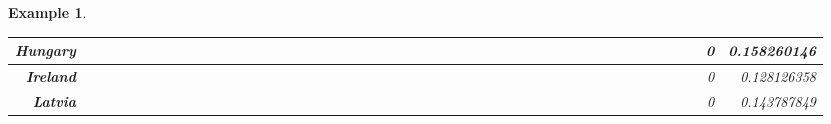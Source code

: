 \documentclass[a4paper,11pt]{report}
\newtheorem{example}[theorem]{Example}
\begin{document}
\begin{example}
\begin{appendices}
\begin{landscape}
\begin{longtable}{r|r|r|r|r|r|r|r|r|r|r|r|r|r|r|r|r|r|r|r|r|r|r|r|r|r|r|r|r|r|r|r|r|r|r|r|r|r|r|r|r|r|r|r|r|r|r|}
\multicolumn{1}{|r|}{\textbf{Hungary}}               &                  &                  &                  &                     &                  &                  &                                &                   &                  &                 &                         &                  &                  &                           &                  &                 &                  &                 &                  &                  &                  &                 &                 &                    &                &                  &                     &                 &                 &                   &                  &                 &                 &                   &                   &                &                 &                      &                          &                 &                  &                         &                 &                & 0                        & 0.158260146        \\ \hline
\multicolumn{1}{|r|}{\textbf{Ireland}}               &                  &                  &                  &                     &                  &                  &                                &                   &                  &                 &                         &                  &                  &                           &                  &                 &                  &                 &                  &                  &                  &                 &                 &                    &                &                  &                     &                 &                 &                   &                  &                 &                 &                   &                   &                &                 &                      &                          &                 &                  &                         &                 &                & 0                        & 0.128126358        \\ \hline
\multicolumn{1}{|r|}{\textbf{Latvia}}                &                  &                  &                  &                     &                  &                  &                                &                   &                  &                 &                         &                  &                  &                           &                  &                 &                  &                 &                  &                  &                  &                 &                 &                    &                &                  &                     &                 &                 &                   &                  &                 &                 &                   &                   &                &                 &                      &                          &                 &                  &                         &                 &                & 0                        & 0.143787849        \\ \hline

\end{longtable}
\end{landscape}
\end{appendices}
\end{example}
\end{document}
